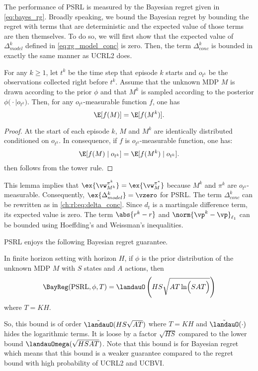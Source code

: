The performance of PSRL is measured by the Bayesian regret given in \eqref{eq:bayes_rg}.
Broadly speaking, we bound the Bayesian regret by bounding the regret with terms that are deterministic and the expected value of those terms are then themselves.
To do so, we will first show that the expected value of $\Delta^k_{model}$ defined in \eqref{eq:rg_model_conc} is zero.
Then, the term $\Delta^k_{conc}$ is bounded in exactly the same manner as UCRL2 does.
\begin{lem}
    \label{lem:expected_identity}
    For any $k\ge1$, let $t^k$ be the time step that episode $k$ starts and $o_{t^k}$ be the observations collected right before $t^k$.
    Assume that the unknown MDP $M$ is drawn according to the prior $\phi$ and that $M^k$ is sampled according to the posterior $\phi\bigl(\cdot\mid o_{t^k}\bigr)$. Then, for any $o_{t^k}$-measurable function $f$, one has
    \begin{equation}
        \label{eq:exp_iden}
        \E[f(M)] =\E[f(M^k)].
    \end{equation}
\end{lem}
\begin{proof}
    At the start of each episode $k$, $M$ and $M^k$ are identically distributed conditioned on $o_{t^k}$.
    In consequence, if $f$ is $o_{t^k}$-measurable function, one has:
    \begin{align*}    
        \E[f(M) \mid o_{t^k}] =\E[f(M^k) \mid o_{t^k}].
    \end{align*}
     then follows from the tower rule.
\end{proof}
This lemma implies that $\ex{\vw^{\pi^k}_{M^k}}=\ex{\vw^{\pi^*}_M}$ because $M^k$ and $\pi^k$ are $o_{t^k}$-measurable.
Consequently, $\ex{\Delta^k_{model}}=\vzero$ for PSRL.
The term $\Delta^k_{conc}$ can be rewritten as in \eqref{ch:rl:eq:delta_conc}.
Since $d_t$ is a martingale difference term, its expected value is zero.
The term $\abs{r^k-r}$ and $\norm{\vp^k-\vp}_{\ell_1}$ can be bounded using Hoeffding's and Weissman's inequalities.

PSRL enjoys the following Bayesian regret guarantee.
\begin{prop}
    \label{prop:brg_psrl}
    In finite horizon setting with horizon $H$, if $\phi$ is the prior distribution of the unknown MDP $M$ with $S$ states and $A$ actions, then
    \begin{equation}
        \label{eq:brg_psrl}
        \BayReg(\mathrm{PSRL}, \phi, T) = \landauO\left(HS\sqrt{AT\ln\Bigl(SAT\Bigr)}\right)
    \end{equation}
    where $T=KH$.
\end{prop}
So, this bound is of order $\tilde{\landauO}(HS\sqrt{AT})$ where $T=KH$ and $\tilde{\landauO}(\cdot)$ hides the logarithmic terms.
It is loose by a factor $\sqrt{HS}$ compared to the lower bound $\landauOmega(\sqrt{HSAT})$.
Note that this bound is for Bayesian regret which means that this bound is a weaker guarantee compared to the regret bound with high probability of UCRL2 and UCBVI.

